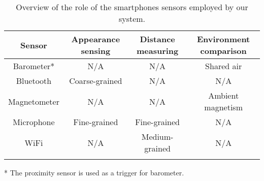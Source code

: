 \documentclass[graybox]{svmult}
\begin{document}
\begin{table}[h]
	\caption{Overview of the role of the smartphones sensors employed by our system.}
	\centering
	\begin{tabular}{c c c c}
		\toprule
		\textbf{Sensor} & \textbf{Appearance sensing} & \textbf{Distance measuring} & \textbf{Environment comparison} \\
		\midrule
		Barometer* & N/A & N/A & Shared air \\ \addlinespace[0.2cm]
		Bluetooth & Coarse-grained & N/A & N/A \\ \addlinespace[0.2cm]
		Magnetometer & N/A & N/A & Ambient magnetism \\ \addlinespace[0.2cm]
		Microphone & Fine-grained & Fine-grained & N/A \\ \addlinespace[0.2cm]
		WiFi & N/A & Medium-grained & N/A \\ \addlinespace[0.2cm]
		\bottomrule
	\end{tabular}
	
	* The proximity sensor is used as a trigger for barometer.
	\label{sensorsemployed}
\end{table}
\end{document}
